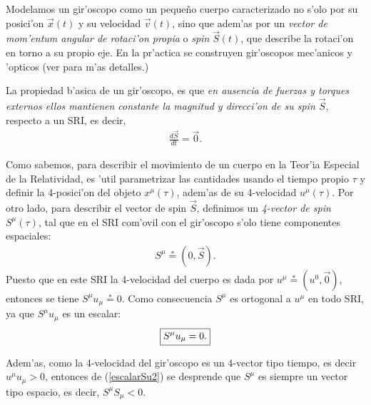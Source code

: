 Modelamos un gir'oscopo como un peque\~no cuerpo caracterizado no s'olo por %
su posici'on $\vec{x}(t)$ y su velocidad $\vec{v}(t)$, sino que adem'as por un \textit{vector de mom'entum angular de rotaci'on propia} o \textit{spin} $\vec{S}(t)$, que describe la rotaci'on en torno a su propio eje. En la pr'actica se construyen gir'oscopos mec'anicos y 'opticos (ver \cite{1} para m'as detalles.)

La propiedad b'asica de un gir'oscopo, es que \textit{en ausencia de fuerzas y torques externos ellos mantienen constante la magnitud y direcci'on de su spin $\vec{S}$}, respecto a un SRI, es decir, 
\begin{align}
\frac{d\vec{S}}{dt}=\vec{0}.\label{dinamicaS1}
\end{align}


Como sabemos, para describir el movimiento de un cuerpo en la Teor'ia Especial de la Relatividad, es 'util parametrizar las cantidades usando el tiempo propio $\tau$ y definir la 4-posici'on del objeto $x^\mu (\tau)$, adem'as de su 4-velocidad $u^\mu (\tau)$. Por otro lado, para describir el vector de spin $\vec{S}$, definimos un \textit{4-vector de spin} $S^\mu (\tau)$, tal que en el SRI com'ovil con el gir'oscopo s'olo tiene componentes espaciales:
\begin{align}
S^\mu \stackrel{*}{=}(0,\vec{S}).
\end{align}
Puesto que en este SRI la 4-velocidad del cuerpo es dada por $u^\mu\stackrel{*}{=}(u^0,\vec{0})$, entonces se tiene $S^\mu u_\mu\stackrel{*}{=}0$. Como consecuencia $S^{\mu}$ es ortogonal a $u^{\mu}$ en todo SRI, ya que $S^\mu u_\mu$ es un escalar:
\begin{equation}\boxed{\label{escalarSu2}
S^\mu u_\mu=0.}
\end{equation}

Adem'as, como la 4-velocidad del gir'oscopo es un 4-vector tipo tiempo, es decir $u^{\mu}u_{\mu}>0$, entonces de (\ref{escalarSu2}) se desprende que $S^{\mu}$ es siempre un vector tipo espacio, es decir, $S^\mu S_{\mu}<0$.

